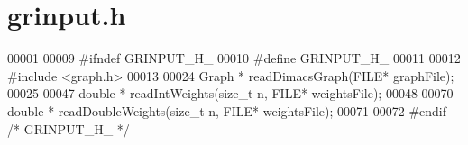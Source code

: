 \section{grinput.\+h}
\label{grinput_8h_source}

\begin{DoxyCode}
00001 
00009 \textcolor{preprocessor}{#ifndef GRINPUT\_H\_}
00010 \textcolor{preprocessor}{#define GRINPUT\_H\_}
00011 
00012 \textcolor{preprocessor}{#include <graph.h>}
00013 
00024 Graph * readDimacsGraph(FILE* graphFile);
00025 
00047 \textcolor{keywordtype}{double} * readIntWeights(\textcolor{keywordtype}{size\_t} n, FILE* weightsFile);
00048 
00070 \textcolor{keywordtype}{double} * readDoubleWeights(\textcolor{keywordtype}{size\_t} n, FILE* weightsFile);
00071 
00072 \textcolor{preprocessor}{#endif }\textcolor{comment}{/* GRINPUT\_H\_ */}\textcolor{preprocessor}{}
\end{DoxyCode}
